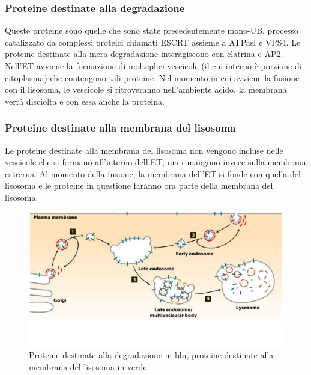         \subsubsection{Proteine destinate alla degradazione}
            Queste proteine sono quelle che sono state precedentemente mono-UB, processo catalizzato da complessi proteici chiamati ESCRT assieme a ATPasi e VPS4.
            Le proteine destinate alla mera degradazione interagiscono con clatrina e AP2. Nell'ET avviene la formazione di molteplici vescicole (il cui interno è porzione di citoplasma) che contengono tali proteine. 
            Nel momento in cui avviene la fusione con il lisosoma, le vescicole si ritroveranno nell'ambiente acido, la membrana verrà disciolta e con essa anche la proteina.
        \subsubsection{Proteine destinate alla membrana del lisosoma}
            Le proteine destinate alla membrana del lisosoma non vengono incluse nelle vescicole che si formano all'interno dell'ET, ma rimangono invece sulla membrana estrerna. Al momento della fusione, la membrana dell'ET si fonde con quella del lisosoma e le proteine in questione faranno ora parte della membrana del lisosoma.
        \begin{figure}[h]
            \centering
            \includegraphics[width=1\textwidth]{images/degradazioneLisosoma.JPG}
            \caption{\small Proteine destinate alla degradazione in blu, proteine destinate alla membrana del lisosoma in verde}
            \label{fig:mesh1}
        \end{figure}
